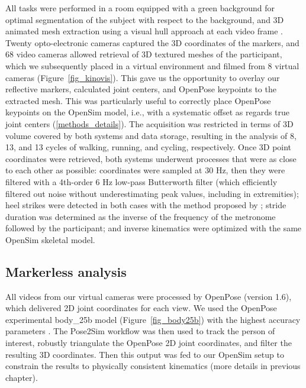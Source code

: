 All tasks were performed in a room equipped with a green background for optimal segmentation of the subject with respect to the background, and 3D animated mesh extraction using a visual hull approach at each video frame \cite{Laurentini1994}. Twenty opto-electronic cameras captured the 3D coordinates of the markers, and 68 video cameras allowed retrieval of 3D textured meshes of the participant, which we subsequently placed in a virtual environment and filmed from 8 virtual cameras (Figure~\ref{fig_kinovis}). This gave us the opportunity to overlay our reflective markers, calculated joint centers, and OpenPose keypoints to the extracted mesh. This was particularly useful to correctly place OpenPose keypoints on the OpenSim model, i.e., with a systematic offset as regards true joint centers (\autoref{methods_details}). The acquisition was restricted in terms of 3D volume covered by both systems and data storage, resulting in the analysis of 8, 13, and 13 cycles of walking, running, and cycling, respectively. Once 3D point coordinates were retrieved, both systems underwent processes that were as close to each other as possible: coordinates were sampled at 30 Hz, then they were filtered with a 4th-order 6 Hz low-pass Butterworth filter (which efficiently filtered out noise without underestimating peak values, including in extremities); heel strikes were detected in both cases with the method proposed by \cite{Zeni2008}; stride duration was determined as the inverse of the frequency of the metronome followed by the participant; and inverse kinematics were optimized with the same OpenSim skeletal model.

\subsection{Markerless analysis}

All videos from our virtual cameras were processed by OpenPose (version 1.6), which delivered 2D joint coordinates for each view. We used the OpenPose experimental body\_25b model (Figure~\ref{fig_body25b}) with the highest accuracy parameters \cite{Hidalgo2021}. The Pose2Sim workflow was then used to track the person of interest, robustly triangulate the OpenPose 2D joint coordinates, and filter the resulting 3D coordinates. Then this output was fed to our OpenSim setup to constrain the results to physically consistent kinematics (more details in previous chapter). 

